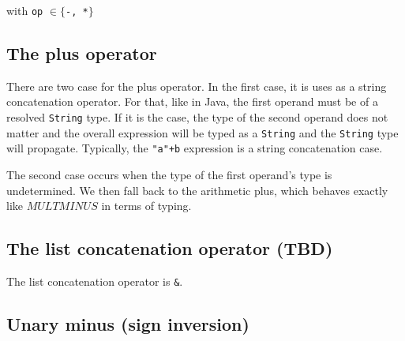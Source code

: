 \documentclass[11pt]{report}
\begin{document}
\begin{center}
 
\DP
\end{center}
\begin{center}with  \texttt{op} $\in \{$\texttt{-, *}$\}$\end{center}


\subsection{The plus operator}

There are two case for the plus operator. In the first case, it is uses as a string concatenation operator. For that, like in Java, the first operand must be of a resolved \texttt{String} type. If it is the case, the type of the second operand does not matter and the overall expression will be typed as a \texttt{String} and the \texttt{String} type will propagate. Typically, the \texttt{"a"+b} expression is a string concatenation case.

\begin{center}
 
\DP
\end{center}

The second case occurs when the type of the first operand's type is undetermined. We then fall back to the arithmetic plus, which behaves exactly like $MULTMINUS$ in terms of typing.

\begin{center}
 
\DP
\end{center}

\subsection{The list concatenation operator (TBD)} 

The list concatenation operator is \texttt{\&}.

\begin{center}
 
\DP
\end{center}

\subsection{Unary minus (sign inversion)}
\end{document}
